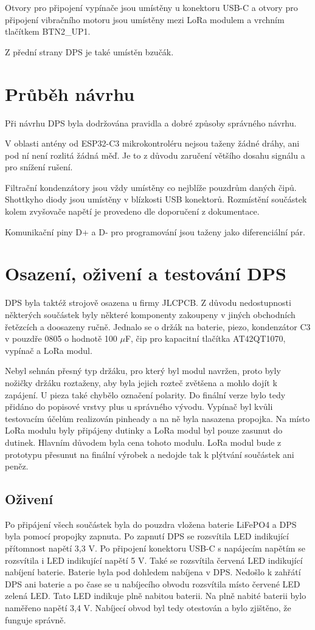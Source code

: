 Otvory pro připojení vypínače jsou umístěny u konektoru USB-C a otvory pro připojení vibračního motoru jsou umístěny mezi LoRa modulem a vrchním tlačítkem BTN2\_UP1. 

Z přední strany DPS je také umístěn bzučák. 

\section{Průběh návrhu}
Při návrhu DPS byla dodržována pravidla a dobré způsoby správného návrhu. %

V oblasti antény od ESP32-C3 mikrokontroléru nejsou taženy žádné dráhy, ani pod ní není rozlitá žádná měď. Je to z důvodu zaručení většího dosahu signálu a pro snížení rušení. 

Filtrační kondenzátory jsou vždy umístěny co nejblíže pouzdrům daných čipů. Shottkyho diody jsou umístěny v blízkosti USB konektorů. Rozmístění součástek kolem zvyšovače napětí 
je provedeno dle doporučení z dokumentace. 

Komunikační piny D+ a D- pro programování jsou taženy jako diferenciální pár.

\section{Osazení, oživení a testování DPS}
DPS byla taktéž strojově osazena u firmy JLCPCB. Z důvodu nedostupnosti některých součástek byly některé komponenty zakoupeny v jiných obchodních řetězcích a doosazeny ručně. 
Jednalo se o držák na baterie, piezo, kondenzátor C3 v pouzdře 0805 o hodnotě 100 $\mu$F, čip pro kapacitní tlačítka AT42QT1070, vypínač a LoRa modul. 

Nebyl sehnán přesný typ držáku, pro který byl modul navržen, proto byly nožičky držáku roztaženy, aby byla jejich rozteč zvětšena a mohlo dojít k zapájení. U pieza také chybělo 
označení polarity. Do finální verze bylo tedy přidáno do popisové vrstvy plus u správného vývodu. Vypínač byl kvůli testovacím účelům realizován pinheady a na ně byla nasazena 
propojka. Na místo LoRa modulu byly připájeny dutinky a LoRa modul byl pouze zasunut do dutinek. Hlavním důvodem byla cena tohoto modulu. LoRa modul bude z prototypu přesunut 
na finální výrobek a nedojde tak k plýtvání součástek ani peněz.

\subsection{Oživení}
Po připájení všech součástek byla do pouzdra vložena baterie LiFePO4 a DPS byla pomocí propojky zapnuta. Po zapnutí DPS se rozsvítila LED indikující přítomnost napětí 3,3 V. 
Po připojení konektoru USB-C s napájecím napětím se rozsvítila i LED indikující napětí 5 V. Také se rozsvítila červená LED indikující nabíjení baterie. Baterie byla pod dohledem 
nabíjena v DPS. Nedošlo k zahřátí DPS ani baterie a po čase se u nabíjecího obvodu rozsvítila místo červené LED zelená LED. Tato LED indikuje plně nabitou baterii. Na plně nabité 
baterii bylo naměřeno napětí 3,4 V. Nabíjecí obvod byl tedy otestován a bylo zjištěno, že funguje správně. 

